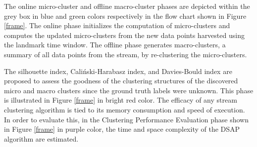 The online micro-cluster and offline macro-cluster phases are depicted within the grey box in blue and green colors respectively in the flow chart shown in Figure \ref{frame}. The online phase initializes the computation of micro-clusters and computes the updated micro-clusters from the new data points harvested using the landmark time window. The offline phase generates macro-clusters, a summary of all data points from the stream, by re-clustering the micro-clusters. 

The silhouette index, Caliński-Harabasz index, and Davies-Bould index are proposed to assess the goodness of  the clustering structures of the discovered micro and macro clusters since the ground truth labels were unknown. This phase is illustrated in Figure \ref{frame} in bright red color. The efficacy of any stream clustering algorithm is tied to its memory consumption and speed of execution. In order to evaluate this, in the Clustering Performance Evaluation phase shown in Figure \ref{frame} in purple color, the time and space complexity of the DSAP algorithm are estimated. 


























